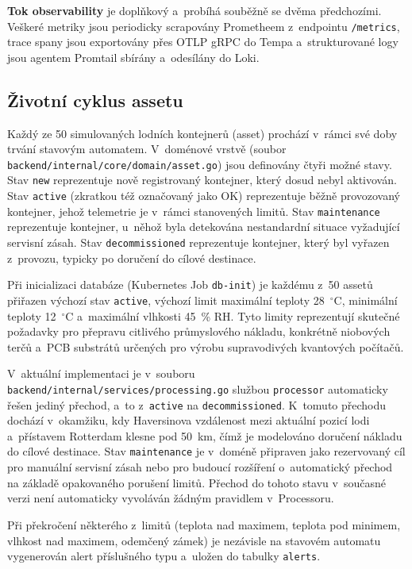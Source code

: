 \documentclass[11pt, a4paper, oneside]{article}
\begin{document}
\textbf{Tok observability} je doplňkový a~probíhá souběžně se dvěma předchozími. Veškeré metriky jsou periodicky scrapovány Prometheem z~endpointu \texttt{/metrics}, trace spany jsou exportovány přes OTLP gRPC do Tempa a~strukturované logy jsou agentem Promtail sbírány a~odesílány do Loki.

\subsection{Životní cyklus assetu}

Každý ze 50 simulovaných lodních kontejnerů (asset) prochází v~rámci své doby trvání stavovým automatem. V~doménové vrstvě (soubor \texttt{backend/internal/core/domain/asset.go}) jsou definovány čtyři možné stavy. Stav \texttt{new} reprezentuje nově registrovaný kontejner, který dosud nebyl aktivován. Stav \texttt{active} (zkratkou též označovaný jako OK) reprezentuje běžně provozovaný kontejner, jehož telemetrie je v~rámci stanovených limitů. Stav \texttt{maintenance} reprezentuje kontejner, u~něhož byla detekována nestandardní situace vyžadující servisní zásah. Stav \texttt{decommissioned} reprezentuje kontejner, který byl vyřazen z~provozu, typicky po doručení do cílové destinace.

Při inicializaci databáze (Kubernetes Job \texttt{db-init}) je každému z~50 assetů přiřazen výchozí stav \texttt{active}, výchozí limit maximální teploty 28~$^\circ$C, minimální teploty 12~$^\circ$C a~maximální vlhkosti 45~\% RH. Tyto limity reprezentují skutečné požadavky pro přepravu citlivého průmyslového nákladu, konkrétně niobových terčů a~PCB substrátů určených pro výrobu supravodivých kvantových počítačů.

V~aktuální implementaci je v~souboru \texttt{backend/internal/services/processing.go} službou \texttt{processor} automaticky řešen jediný přechod, a~to z~\texttt{active} na \texttt{decommissioned}. K~tomuto přechodu dochází v~okamžiku, kdy Haversinova vzdálenost mezi aktuální pozicí lodi a~přístavem Rotterdam klesne pod 50~km, čímž je modelováno doručení nákladu do cílové destinace. Stav \texttt{maintenance} je v~doméně připraven jako rezervovaný cíl pro manuální servisní zásah nebo pro budoucí rozšíření o~automatický přechod na základě opakovaného porušení limitů. Přechod do tohoto stavu v~současné verzi není automaticky vyvoláván žádným pravidlem v~Processoru.

Při překročení některého z~limitů (teplota nad maximem, teplota pod minimem, vlhkost nad maximem, odemčený zámek) je nezávisle na stavovém automatu vygenerován alert příslušného typu a~uložen do tabulky \texttt{alerts}.
\end{document}
